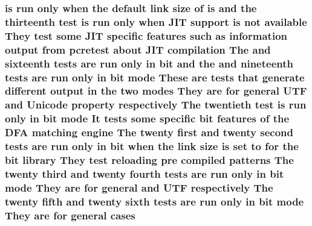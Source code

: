 \subsubsection[{\texorpdfstring{cases}{cases}}]{ {\bf is} {\bf run} only when the {\bf default} link {\bf size} {\bf of} {\bf is} and the thirteenth test {\bf is} {\bf run} only when J\+IT {\bf support} {\bf is} {\bf not} {\bf available} They test some J\+IT specific {\bf features} such {\bf as} information {\bf output} {\bf from} {\bf pcretest} about J\+IT {\bf compilation} The and sixteenth {\bf tests} {\bf are} {\bf run} only {\bf in} {\bf bit} and the and nineteenth {\bf tests} {\bf are} {\bf run} only {\bf in} {\bf bit} {\bf mode} These {\bf are} {\bf tests} that generate different {\bf output} {\bf in} the two {\bf modes} They {\bf are} for general U\+TF and {\bf Unicode} property {\bf respectively} The twentieth test {\bf is} {\bf run} only {\bf in} {\bf bit} {\bf mode} It {\bf tests} some specific {\bf bit} {\bf features} {\bf of} the D\+FA {\bf matching} engine The twenty {\bf first} and twenty {\bf second} {\bf tests} {\bf are} {\bf run} only {\bf in} {\bf bit} when the link {\bf size} {\bf is} {\bf set} {\bf to} for the {\bf bit} {\bf library} They test reloading pre {\bf compiled} {\bf patterns} The twenty third and twenty fourth {\bf tests} {\bf are} {\bf run} only {\bf in} {\bf bit} {\bf mode} They {\bf are} for general and U\+TF {\bf respectively} The twenty fifth and twenty sixth {\bf tests} {\bf are} {\bf run} only {\bf in} {\bf bit} {\bf mode} They {\bf are} for general cases}\hypertarget{README_8txt_afeed788d96dde0dab33a3cb54ef71635}{}\label{README_8txt_afeed788d96dde0dab33a3cb54ef71635}
